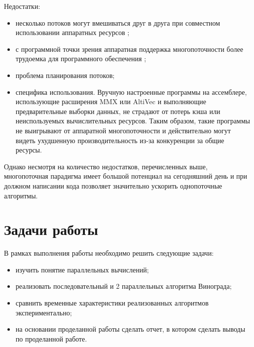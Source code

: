Недостатки:
\begin{itemize}
	\item несколько потоков могут вмешиваться друг в друга при совместном использовании аппаратных ресурсов \cite{Nemirovsky};
	\item с программной точки зрения аппаратная поддержка многопоточности более трудоемка для программного обеспечения \cite{Olukotun};
	\item проблема планирования потоков;
	\item специфика использования. Вручную настроенные программы на ассемблере, использующие расширения MMX или AltiVec и выполняющие предварительные выборки данных, не страдают от потерь кэша или неиспользуемых вычислительных ресурсов. Таким образом, такие программы не выигрывают от аппаратной многопоточности и действительно могут видеть ухудшенную производительность из-за конкуренции за общие ресурсы.
\end{itemize}
Однако несмотря на количество недостатков, перечисленных выше, многопоточная парадигма имеет большой потенциал на сегодняшний день и при должном написании кода позволяет значительно ускорить однопоточные алгоритмы.

\section*{Задачи работы}

В рамках выполнения работы необходимо решить следующие задачи:
\begin{itemize}
	\item изучить понятие параллельных вычислений;
    \item реализовать последовательный и 2 параллельных алгоритма Винограда;
	\item сравнить временные характеристики реализованных алгоритмов экспериментально;
	\item на основании проделанной работы сделать отчет, в котором сделать выводы по проделанной работе.
\end{itemize}

